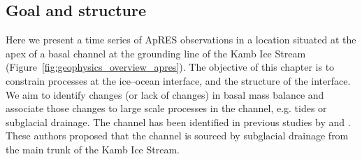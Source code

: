 
\subsection{Goal and structure}
Here we present a time series of ApRES observations in a location situated at the apex of a basal channel at the grounding line of the Kamb Ice Stream (Figure~\ref{fig:geophysics_overview_apres}).  The objective of this chapter is to constrain processes at the ice--ocean interface, and the structure of the interface. We aim to identify changes (or lack of changes) in basal mass balance and associate those changes to large scale processes in the channel, e.g. tides or subglacial drainage.
 The channel has been identified in previous studies by \cite{alley2016impacts,kim2016active,goeller2015subglacial,le2009subglacial} and \cite{horgan2017poststagnation}. These authors proposed that the channel is sourced by subglacial drainage from the main trunk of the Kamb Ice Stream. 

